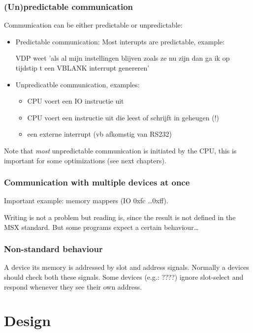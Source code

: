 \documentclass[11pt, a4paper]{report}
\begin{document}
\subsection{(Un)predictable communication}

Communication can be either predictable or unpredictable:
\begin{itemize}
\item Predictable communication: Most interupts are predictable, example:

VDP weet 'als al mijn instellingen blijven zoals ze nu zijn dan ga ik op 
tijdstip t een VBLANK interrupt genereren'

\item Unpredicatble communication, examples:
	\begin{itemize}
	\item CPU voert een IO instructie uit
	\item CPU voert een instructie uit die leest of schrijft in geheugen (!)
	\item een externe interrupt (vb afkomstig van RS232)
	\end{itemize}
\end{itemize}

Note that \emph{most} unpredictable communication is initiated by the CPU, this is
important for some optimizations (see next chapters).


\subsection{Communication with multiple devices at once}

Important example: memory mappers (IO 0xfc \ldots 0xff).

Writing is not a problem but reading is, since the result is not defined in the MSX
standard. But some programs expect a certain behaviour\ldots


\subsection {Non-standard behaviour}

A device its memory is addressed by slot and address signals. Normally a devices
should check both these signals. Some devices (e.g.: ????) ignore slot-select
and respond whenever they see their own address.




\chapter{Design}
\end{document}
